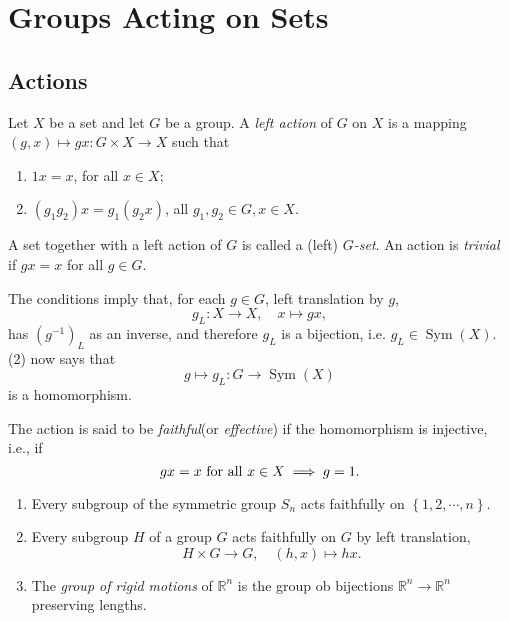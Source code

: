 \section{Groups Acting on Sets}

\subsection{Actions}

\begin{definition}
  Let \( X \) be a set and let \( G \) be a group.
  A \emph{left action} of \( G \) on \( X \) is a mapping \( (g, x) \mapsto gx: G \times X \to X \) such that
  \begin{enumerate}
    \item \( 1x = x \), for all \( x \in X \);
    \item \( (g_1 g_2) x = g_1 (g_2x) \), all \( g_1, g_2 \in G, x \in X \).
  \end{enumerate}
  A set together with a left action of \( G \) is called a (left) \emph{\( G \)-set}.
  An action is \emph{trivial} if \( gx = x \) for all \( g \in G \).
\end{definition}

The conditions imply that, for each \( g \in G \), left translation by \( g \),
\[
  g_L: X \to X,\quad x \mapsto gx,
\]
has \( (g^{-1})_L \) as an inverse, and therefore \( g_L \) is a bijection, i.e. \( g_L \in \operatorname{Sym}(X) \).
(2) now says that
\[
  g \mapsto g_L: G \to \operatorname{Sym}(X)
\]
is a homomorphism.

\begin{definition}
  The action is said to be \emph{faithful}(or \emph{effective}) if the homomorphism is injective, i.e., if
  \[
    gx = x \textmd{ for all } x \in X \implies g = 1.
  \]
\end{definition}

\begin{example}
  \begin{enumerate}
    \item Every subgroup of the symmetric group \( S_n \) acts faithfully on \( \left\lbrace 1, 2, \cdots, n \right\rbrace \).
    \item Every subgroup \( H \) of a group \( G \) acts faithfully on \( G \) by left translation,
      \[
        H \times G \to G, \quad (h, x) \mapsto hx.
      \]
    \item The \emph{group of rigid motions} of \( \mathbb{R}^n \) is the group ob bijections \( \mathbb{R}^n \to \mathbb{R}^n \) preserving lengths.
  \end{enumerate}
\end{example}

